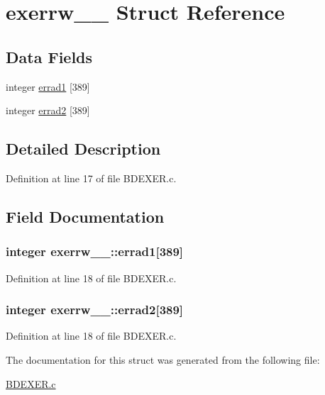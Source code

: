 \hypertarget{structexerrw__1__}{}\section{exerrw\+\_\+\_\+ Struct Reference}
\label{structexerrw__1__}
\subsection*{Data Fields}
\begin{DoxyCompactItemize}
\item 
integer \hyperlink{structexerrw__1___ad9bdd78a2380d52e2b46cb01ecc5db57}{errad1} \mbox{[}389\mbox{]}
\item 
integer \hyperlink{structexerrw__1___a8b13aec22fe74ed0ac69a793e4d32b85}{errad2} \mbox{[}389\mbox{]}
\end{DoxyCompactItemize}


\subsection{Detailed Description}


Definition at line 17 of file B\+D\+E\+X\+E\+R.\+c.



\subsection{Field Documentation}
\subsubsection[{\texorpdfstring{errad1}{errad1}}]{\setlength{\rightskip}{0pt plus 5cm}integer exerrw\+\_\+\_\+\+::errad1\mbox{[}389\mbox{]}}\hypertarget{structexerrw__1___ad9bdd78a2380d52e2b46cb01ecc5db57}{}\label{structexerrw__1___ad9bdd78a2380d52e2b46cb01ecc5db57}


Definition at line 18 of file B\+D\+E\+X\+E\+R.\+c.

\subsubsection[{\texorpdfstring{errad2}{errad2}}]{\setlength{\rightskip}{0pt plus 5cm}integer exerrw\+\_\+\_\+\+::errad2\mbox{[}389\mbox{]}}\hypertarget{structexerrw__1___a8b13aec22fe74ed0ac69a793e4d32b85}{}\label{structexerrw__1___a8b13aec22fe74ed0ac69a793e4d32b85}


Definition at line 18 of file B\+D\+E\+X\+E\+R.\+c.



The documentation for this struct was generated from the following file\+:\begin{DoxyCompactItemize}
\item 
\hyperlink{BDEXER_8c}{B\+D\+E\+X\+E\+R.\+c}\end{DoxyCompactItemize}
